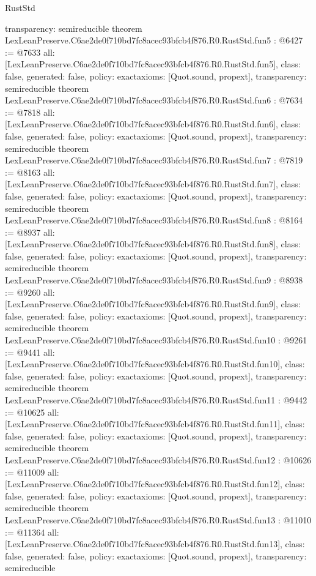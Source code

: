 \begin{lexlean}{RustStd}
\begin{coremodule}
{  transparency: semireducible
}
theorem LexLeanPreserve.C6ae2de0f710bd7fc8acec93bfcb4f876.R0.RustStd.fun5 : @6427 := @7633 {
  all: [LexLeanPreserve.C6ae2de0f710bd7fc8acec93bfcb4f876.R0.RustStd.fun5],
  class: false,
  generated: false,
  policy: exact{axioms: [Quot.sound, propext]},
  transparency: semireducible
}
theorem LexLeanPreserve.C6ae2de0f710bd7fc8acec93bfcb4f876.R0.RustStd.fun6 : @7634 := @7818 {
  all: [LexLeanPreserve.C6ae2de0f710bd7fc8acec93bfcb4f876.R0.RustStd.fun6],
  class: false,
  generated: false,
  policy: exact{axioms: [Quot.sound, propext]},
  transparency: semireducible
}
theorem LexLeanPreserve.C6ae2de0f710bd7fc8acec93bfcb4f876.R0.RustStd.fun7 : @7819 := @8163 {
  all: [LexLeanPreserve.C6ae2de0f710bd7fc8acec93bfcb4f876.R0.RustStd.fun7],
  class: false,
  generated: false,
  policy: exact{axioms: [Quot.sound, propext]},
  transparency: semireducible
}
theorem LexLeanPreserve.C6ae2de0f710bd7fc8acec93bfcb4f876.R0.RustStd.fun8 : @8164 := @8937 {
  all: [LexLeanPreserve.C6ae2de0f710bd7fc8acec93bfcb4f876.R0.RustStd.fun8],
  class: false,
  generated: false,
  policy: exact{axioms: [Quot.sound, propext]},
  transparency: semireducible
}
theorem LexLeanPreserve.C6ae2de0f710bd7fc8acec93bfcb4f876.R0.RustStd.fun9 : @8938 := @9260 {
  all: [LexLeanPreserve.C6ae2de0f710bd7fc8acec93bfcb4f876.R0.RustStd.fun9],
  class: false,
  generated: false,
  policy: exact{axioms: [Quot.sound, propext]},
  transparency: semireducible
}
theorem LexLeanPreserve.C6ae2de0f710bd7fc8acec93bfcb4f876.R0.RustStd.fun10 : @9261 := @9441 {
  all: [LexLeanPreserve.C6ae2de0f710bd7fc8acec93bfcb4f876.R0.RustStd.fun10],
  class: false,
  generated: false,
  policy: exact{axioms: [Quot.sound, propext]},
  transparency: semireducible
}
theorem LexLeanPreserve.C6ae2de0f710bd7fc8acec93bfcb4f876.R0.RustStd.fun11 : @9442 := @10625 {
  all: [LexLeanPreserve.C6ae2de0f710bd7fc8acec93bfcb4f876.R0.RustStd.fun11],
  class: false,
  generated: false,
  policy: exact{axioms: [Quot.sound, propext]},
  transparency: semireducible
}
theorem LexLeanPreserve.C6ae2de0f710bd7fc8acec93bfcb4f876.R0.RustStd.fun12 : @10626 := @11009 {
  all: [LexLeanPreserve.C6ae2de0f710bd7fc8acec93bfcb4f876.R0.RustStd.fun12],
  class: false,
  generated: false,
  policy: exact{axioms: [Quot.sound, propext]},
  transparency: semireducible
}
theorem LexLeanPreserve.C6ae2de0f710bd7fc8acec93bfcb4f876.R0.RustStd.fun13 : @11010 := @11364 {
  all: [LexLeanPreserve.C6ae2de0f710bd7fc8acec93bfcb4f876.R0.RustStd.fun13],
  class: false,
  generated: false,
  policy: exact{axioms: [Quot.sound, propext]},
  transparency: semireducible
}
\end{coremodule}
\end{lexlean}
